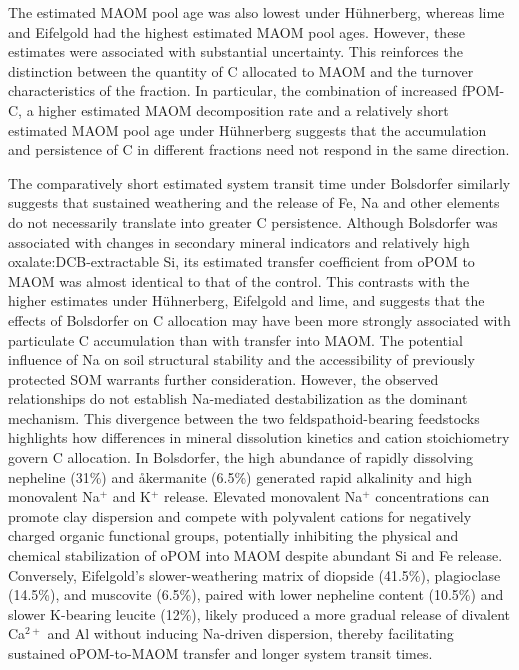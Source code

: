 \documentclass[preprint,12pt]{elsarticle}
\begin{document}
The estimated MAOM pool age was also lowest under Hühnerberg, whereas lime and Eifelgold had the highest estimated MAOM pool ages. However, these estimates were associated with substantial uncertainty. This reinforces the distinction between the quantity of C allocated to MAOM and the turnover characteristics of the fraction. In particular, the combination of increased fPOM-C, a higher estimated MAOM decomposition rate and a relatively short estimated MAOM pool age under Hühnerberg suggests that the accumulation and persistence of C in different fractions need not respond in the same direction.

The comparatively short estimated system transit time under Bolsdorfer similarly suggests that sustained weathering and the release of Fe, Na and other elements do not necessarily translate into greater C persistence. Although Bolsdorfer was associated with changes in secondary mineral indicators and relatively high oxalate:DCB-extractable Si, its estimated transfer coefficient from oPOM to MAOM was almost identical to that of the control. This contrasts with the higher estimates under Hühnerberg, Eifelgold and lime, and suggests that the effects of Bolsdorfer on C allocation may have been more strongly associated with particulate C accumulation than with transfer into MAOM. The potential influence of Na on soil structural stability and the accessibility of previously protected SOM warrants further consideration. However, the observed relationships do not establish Na-mediated destabilization as the dominant mechanism. This divergence between the two feldspathoid-bearing feedstocks highlights how differences in mineral dissolution kinetics and cation stoichiometry govern C allocation. In Bolsdorfer, the high abundance of rapidly dissolving nepheline (31\%) and \aa kermanite (6.5\%) generated rapid alkalinity and high monovalent Na$^{+}$ and K$^{+}$ release. Elevated monovalent Na$^{+}$ concentrations can promote clay dispersion and compete with polyvalent cations for negatively charged organic functional groups, potentially inhibiting the physical and chemical stabilization of oPOM into MAOM despite abundant Si and Fe release. Conversely, Eifelgold's slower-weathering matrix of diopside (41.5\%), plagioclase (14.5\%), and muscovite (6.5\%), paired with lower nepheline content (10.5\%) and slower K-bearing leucite (12\%), likely produced a more gradual release of divalent Ca$^{2+}$ and Al without inducing Na-driven dispersion, thereby facilitating sustained oPOM-to-MAOM transfer and longer system transit times.
\end{document}
